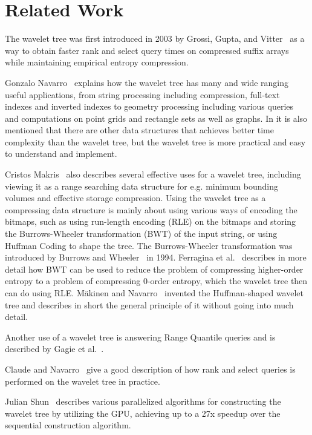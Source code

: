 \section{Related Work}
The wavelet tree was first introduced in 2003 by Grossi, Gupta, and Vitter~ as a way to obtain faster rank and select query times on compressed suffix arrays while maintaining empirical entropy compression.

Gonzalo Navarro~ explains how the wavelet tree has many and wide ranging useful applications, from string processing including compression, full-text indexes and inverted indexes to geometry processing including various queries and computations on point grids and rectangle sets as well as graphs. 
In  it is also mentioned that there are other data structures that achieves better time complexity than the wavelet tree, but the wavelet tree is more practical and easy to understand and implement.

Cristos Makris~ also describes several effective uses for a wavelet tree, including viewing it as a range searching data structure for e.g. minimum bounding volumes and effective storage compression.
Using the wavelet tree as a compressing data structure is mainly about using various ways of encoding the bitmaps, such as using run-length encoding (RLE) on the bitmaps and storing the Burrows-Wheeler transformation (BWT) of the input string, or using Huffman Coding to shape the tree.
The Burrows-Wheeler transformation was introduced by Burrows and Wheeler~ in 1994.
Ferragina et al.~ describes in more detail how BWT can be used to reduce the problem of compressing higher-order entropy to a problem of compressing 0-order entropy, which the wavelet tree then can do using RLE.
Mäkinen and Navarro~ invented the Huffman-shaped wavelet tree and describes in short the general principle of it without going into much detail.

Another use of a wavelet tree is answering Range Quantile queries and is described by Gagie et al.~.

Claude and Navarro~ give a good description of how rank and select queries is performed on the wavelet tree in practice.

Julian Shun~ describes various parallelized algorithms for constructing the wavelet tree by utilizing the GPU, achieving up to a 27x speedup over the sequential construction algorithm.


